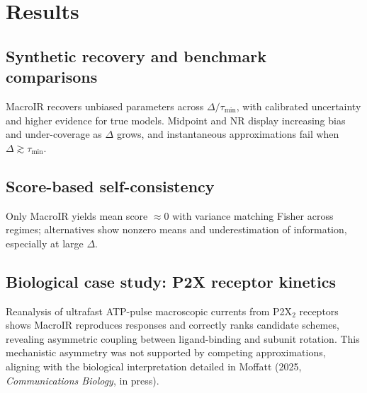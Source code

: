 \documentclass[9pt]{elife}
\begin{document}
\section*{Results}
\subsection*{Synthetic recovery and benchmark comparisons}
MacroIR recovers unbiased parameters across $\Delta/\tau_{\min}$, with calibrated uncertainty and higher evidence for true models. Midpoint and NR display increasing bias and under-coverage as $\Delta$ grows, and instantaneous approximations fail when $\Delta\gtrsim \tau_{\min}$.


\subsection*{Score-based self-consistency}
Only MacroIR yields mean score $\approx 0$ with variance matching Fisher across regimes; alternatives show nonzero means and underestimation of information, especially at large $\Delta$.


\subsection*{Biological case study: P2X receptor kinetics}
Reanalysis of ultrafast ATP-pulse macroscopic currents from P2X$_2$ receptors shows MacroIR reproduces responses and correctly ranks candidate schemes, revealing asymmetric coupling between ligand-binding and subunit rotation. This mechanistic asymmetry was not supported by competing approximations, aligning with the biological interpretation detailed in Moffatt (2025, \emph{Communications Biology}, in press).
\end{document}
